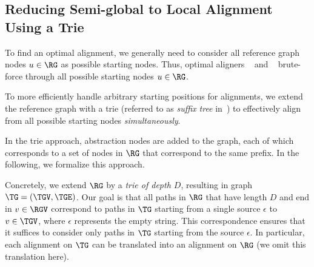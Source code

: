 \subsection{Reducing Semi-global to Local Alignment Using a Trie} \label{TRIEsubsec:trie}
To find an optimal alignment, we generally need to consider all reference graph
nodes $u \in \RG$ as possible starting nodes. Thus, optimal aligners
\pasgal~\cite{jain_accelerating_2019} and
\bitparallel~\cite{rautiainen_bitparallel_2019} brute-force through all
possible starting nodes $u \in \RG$.

To more efficiently handle arbitrary starting positions for alignments, we
extend the reference graph with a trie (referred to as \textit{suffix tree}
in~\cite{dox2018efficient}) to effectively align from all possible starting
nodes \emph{simultaneously}.

In the trie approach, abstraction nodes are added to the graph, each of which
corresponds to a set of nodes in $\RG$ that correspond to the same prefix. In
the following, we formalize this approach.

Concretely, we extend $\RG$ by a \emph{trie of depth $D$}, resulting in graph
$\TG=(\TGV,\TGE)$. Our goal is that all paths in $\RG$ that have length $D$ and
end in $v \in \RGV$ correspond to paths in $\TG$ starting from a single source
$\epsilon$ to $v \in \TGV$, where $\epsilon$ represents the empty string. This
correspondence ensures that it suffices to consider only paths in $\TG$ starting
from the source $\epsilon$. In particular, each alignment on $\TG$ can
be translated into an alignment on $\RG$ (we omit this translation
here).

